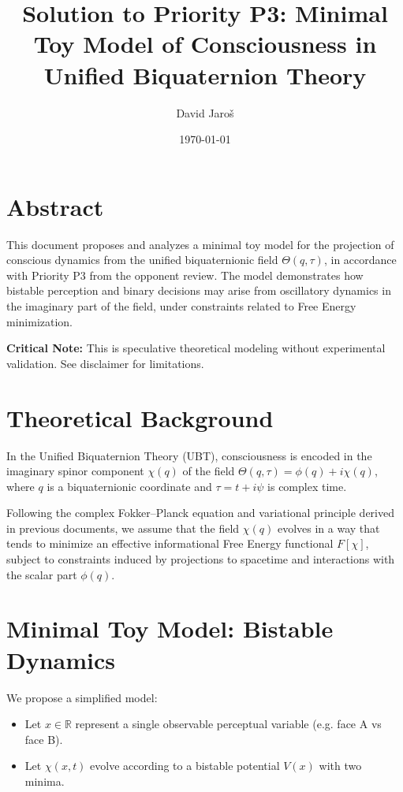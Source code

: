 \documentclass[12pt]{article}
\title{Solution to Priority P3: Minimal Toy Model of Consciousness in Unified Biquaternion Theory}
\author{David Jaroš}
\date{\today}
\begin{document}
\maketitle


\ConsciousnessDisclaimer

\section*{Abstract}
This document proposes and analyzes a minimal toy model for the projection of conscious dynamics from the unified biquaternionic field \(\Theta(q, \tau)\), in accordance with Priority P3 from the opponent review. The model demonstrates how bistable perception and binary decisions may arise from oscillatory dynamics in the imaginary part of the field, under constraints related to Free Energy minimization.

\textbf{Critical Note:} This is speculative theoretical modeling without experimental validation. See disclaimer for limitations.

\section{Theoretical Background}
In the Unified Biquaternion Theory (UBT), consciousness is encoded in the imaginary spinor component \(\chi(q)\) of the field \(\Theta(q, \tau) = \phi(q) + i \chi(q)\), where \(q\) is a biquaternionic coordinate and \(\tau = t + i \psi\) is complex time.

Following the complex Fokker–Planck equation and variational principle derived in previous documents, we assume that the field \(\chi(q)\) evolves in a way that tends to minimize an effective informational Free Energy functional \(F[\chi]\), subject to constraints induced by projections to spacetime and interactions with the scalar part \(\phi(q)\).

\section{Minimal Toy Model: Bistable Dynamics}
We propose a simplified model:
\begin{itemize}
    \item Let \(x \in \mathbb{R}\) represent a single observable perceptual variable (e.g. face A vs face B).
    \item Let \(\chi(x,t)\) evolve according to a bistable potential \(V(x)\) with two minima.
\end{itemize}
\end{document}
